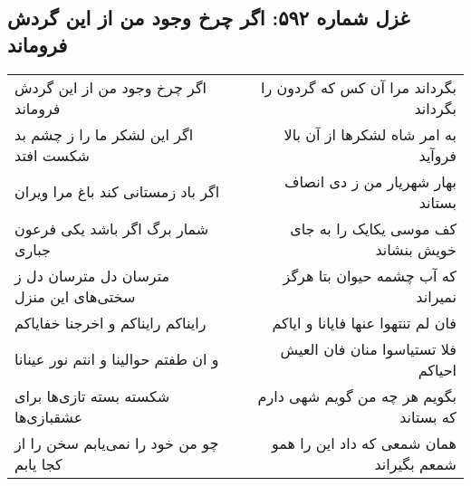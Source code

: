 \begin{center}
\section*{غزل شماره ۵۹۲: اگر چرخ وجود من از این گردش فروماند}
\label{sec:0592}
\begin{longtable}{l p{0.5cm} r}
اگر چرخ وجود من از این گردش فروماند
&&
بگرداند مرا آن کس که گردون را بگرداند
\\
اگر این لشکر ما را ز چشم بد شکست افتد
&&
به امر شاه لشکرها از آن بالا فروآید
\\
اگر باد زمستانی کند باغ مرا ویران
&&
بهار شهریار من ز دی انصاف بستاند
\\
شمار برگ اگر باشد یکی فرعون جباری
&&
کف موسی یکایک را به جای خویش بنشاند
\\
مترسان دل مترسان دل ز سختی‌های این منزل
&&
که آب چشمه حیوان بتا هرگز نمیراند
\\
رایناکم رایناکم و اخرجنا خفایاکم
&&
فان لم تنتهوا عنها فایانا و ایاکم
\\
و ان طفتم حوالینا و انتم نور عینانا
&&
فلا تستیاسوا منان فان العیش احیاکم
\\
شکسته بسته تازی‌ها برای عشقبازی‌ها
&&
بگویم هر چه من گویم شهی دارم که بستاند
\\
چو من خود را نمی‌یابم سخن را از کجا یابم
&&
همان شمعی که داد این را همو شمعم بگیراند
\\
\end{longtable}
\end{center}
